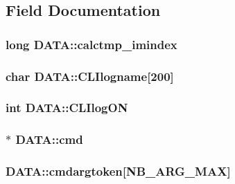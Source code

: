 \subsection{Field Documentation}
\hypertarget{structDATA_a11b6d226ab6612bc5a418abb89b56feb}{
\subsubsection[{calctmp\+\_\+imindex}]{\setlength{\rightskip}{0pt plus 5cm}long D\+A\+T\+A\+::calctmp\+\_\+imindex}}\label{structDATA_a11b6d226ab6612bc5a418abb89b56feb}
\hypertarget{structDATA_aa491474d93756c181862fb907c777b78}{
\subsubsection[{C\+L\+Ilogname}]{\setlength{\rightskip}{0pt plus 5cm}char D\+A\+T\+A\+::\+C\+L\+Ilogname\mbox{[}200\mbox{]}}}\label{structDATA_aa491474d93756c181862fb907c777b78}
\hypertarget{structDATA_abfc40a5bf0093716bcc793aca3ec678c}{
\subsubsection[{C\+L\+Ilog\+O\+N}]{\setlength{\rightskip}{0pt plus 5cm}int D\+A\+T\+A\+::\+C\+L\+Ilog\+O\+N}}\label{structDATA_abfc40a5bf0093716bcc793aca3ec678c}
\hypertarget{structDATA_af0e58ce879fa3017d9131eed5a90cc96}{
\subsubsection[{cmd}]{$\ast$ D\+A\+T\+A\+::cmd}}\label{structDATA_af0e58ce879fa3017d9131eed5a90cc96}
\hypertarget{structDATA_a1072fcd97dbe8660a3b3d7d54b21b300}{
\subsubsection[{cmdargtoken}]{ D\+A\+T\+A\+::cmdargtoken\mbox{[}{\bf N\+B\+\_\+\+A\+R\+G\+\_\+\+M\+A\+X}\mbox{]}}}\label{structDATA_a1072fcd97dbe8660a3b3d7d54b21b300}
